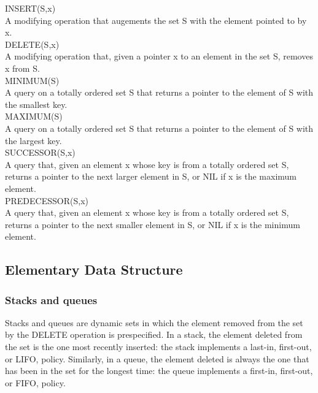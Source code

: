 \documentclass[11pt]{article}
\begin{document}
INSERT(S,x) \\
A modifying operation that augements the set S with the element pointed to by x. \\

DELETE(S,x) \\
A modifying operation that, given a pointer x to an element in the set S, removes x from S. \\

MINIMUM(S) \\
A query on a totally ordered set S that returns a pointer to the element of S with the smallest key. \\

MAXIMUM(S) \\
A query on a totally ordered set S that returns a pointer to the element of S with the largest key. \\

SUCCESSOR(S,x) \\
A query that, given an element x whose key is from a totally ordered set S, returns a pointer to the next larger element in S, or NIL if x is the maximum element. \\

PREDECESSOR(S,x) \\
A query that, given an element x whose key is from a totally ordered set S, returns a pointer to the next smaller element in S, or NIL if x is the minimum element. \\

\subsection{Elementary Data Structure}
\label{sec-4-1}

\subsubsection{Stacks and queues}
\label{sec-4-1-1}
Stacks and queues are dynamic sets in which the element removed from the set by the DELETE operation is prespecified. In a stack, the element deleted from the set is the one most recently inserted: the stack implements a last-in, first-out, or LIFO, policy. Similarly, in a queue, the element deleted is always the one that has been in the set for the longest time: the queue implements a first-in, first-out, or FIFO, policy. \\
\end{document}
